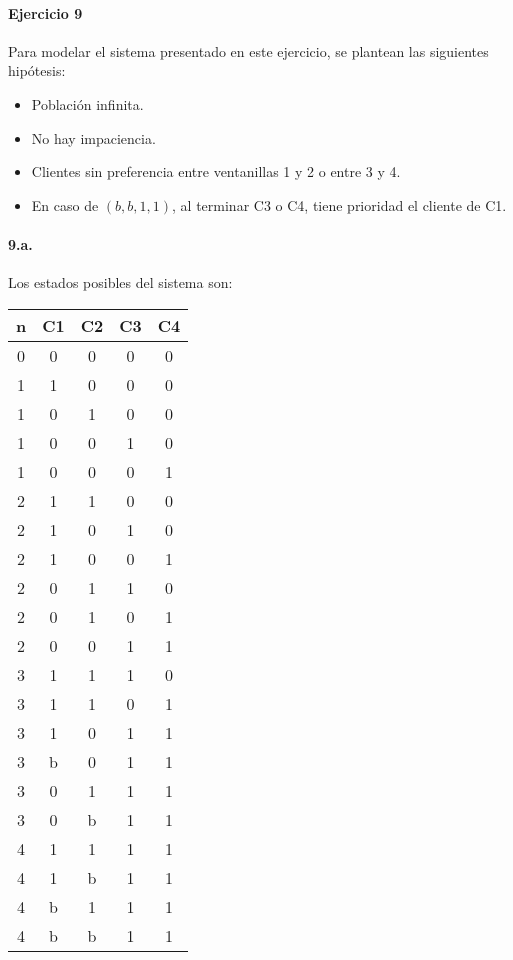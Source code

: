 \documentclass{article}
\begin{document}
\paragraph{Ejercicio 9}
   Para modelar el sistema presentado en este ejercicio, se plantean las siguientes hipótesis:

   \begin{itemize}
      \item Población infinita.
      \item No hay impaciencia.
      \item Clientes sin preferencia entre ventanillas 1 y 2 o entre 3 y 4.
      \item En caso de $(b, b, 1, 1)$, al terminar C3 o C4, tiene prioridad el cliente de C1.
   \end{itemize}

   \paragraph{9.a.} Los estados posibles del sistema son:
   \begin{center}
   \begin{tabular}{|| c | c | c | c | c ||}
   \hline 
      n & C1 & C2 & C3 & C4 \\ \hline \hline
      0 & 0  & 0  & 0  & 0  \\ \hline \hline
      1 & 1  & 0  & 0  & 0  \\ \hline 
      1 & 0  & 1  & 0  & 0  \\ \hline
      1 & 0  & 0  & 1  & 0  \\ \hline
      1 & 0  & 0  & 0  & 1  \\ \hline \hline
      2 & 1  & 1  & 0  & 0  \\ \hline
      2 & 1  & 0  & 1  & 0  \\ \hline
      2 & 1  & 0  & 0  & 1  \\ \hline
      2 & 0  & 1  & 1  & 0  \\ \hline
      2 & 0  & 1  & 0  & 1  \\ \hline
      2 & 0  & 0  & 1  & 1  \\ \hline \hline
      3 & 1  & 1  & 1  & 0  \\ \hline
      3 & 1  & 1  & 0  & 1  \\ \hline
      3 & 1  & 0  & 1  & 1  \\ \hline
      3 & b  & 0  & 1  & 1  \\ \hline
      3 & 0  & 1  & 1  & 1  \\ \hline
      3 & 0  & b  & 1  & 1  \\ \hline \hline
      4 & 1  & 1  & 1  & 1  \\ \hline
      4 & 1  & b  & 1  & 1  \\ \hline
      4 & b  & 1  & 1  & 1  \\ \hline
      4 & b  & b  & 1  & 1  \\ \hline
   \end{tabular}
   \end{center}
\end{document}
